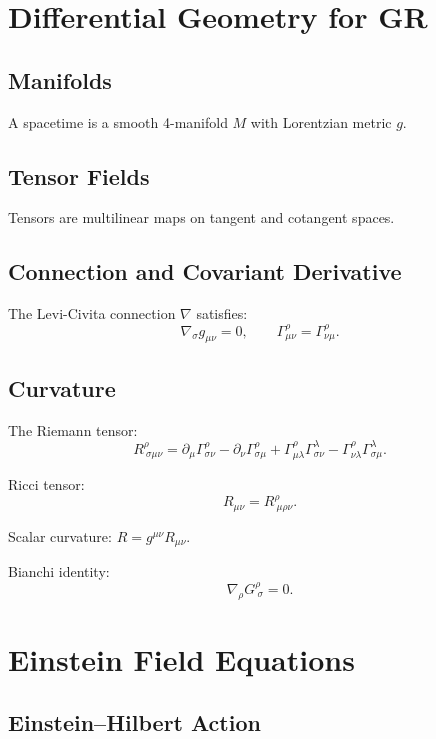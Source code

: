 \documentclass[12pt]{article}
\begin{document}
\section{Differential Geometry for GR}

\subsection{Manifolds}

A spacetime is a smooth 4-manifold $M$ with Lorentzian metric $g$.

\subsection{Tensor Fields}

Tensors are multilinear maps on tangent and cotangent spaces.

\subsection{Connection and Covariant Derivative}

The Levi-Civita connection $\nabla$ satisfies:
\[
\nabla_\sigma g_{\mu\nu} = 0, \qquad
\Gamma^\rho_{\mu\nu} = \Gamma^\rho_{\nu\mu}.
\]

\subsection{Curvature}

The Riemann tensor:
\[
R^\rho_{\ \sigma\mu\nu}
= \partial_\mu\Gamma^\rho_{\sigma\nu}
- \partial_\nu\Gamma^\rho_{\sigma\mu}
+ \Gamma^\rho_{\mu\lambda}\Gamma^\lambda_{\sigma\nu}
- \Gamma^\rho_{\nu\lambda}\Gamma^\lambda_{\sigma\mu}.
\]

Ricci tensor:
\[
R_{\mu\nu}=R^\rho_{\ \mu\rho\nu}.
\]

Scalar curvature: $R = g^{\mu\nu}R_{\mu\nu}$.

Bianchi identity:
\[
\nabla_\rho G^{\rho}_{\ \sigma} = 0.
\]

\section{Einstein Field Equations}

\subsection{Einstein--Hilbert Action}
\end{document}
